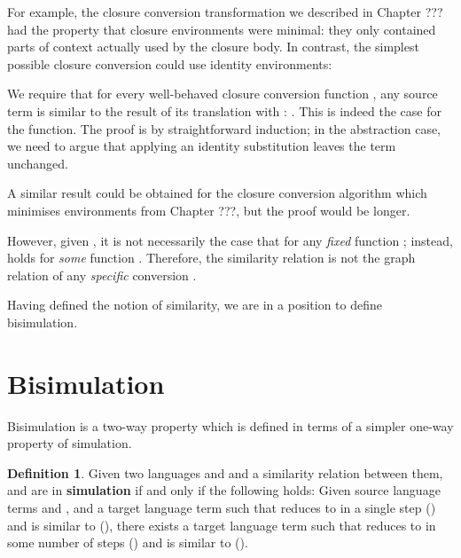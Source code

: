 \documentclass[bsc,frontabs,twoside,singlespacing,parskip,deptreport]{infthesis}
\theoremstyle{definition}
\newtheorem*{definition}{Definition}
\begin{document}
For example, the closure conversion transformation we described in
Chapter ??? had the property that closure environments were minimal:
they only contained parts of context actually used by the closure
body. In contrast, the simplest possible closure conversion could use
identity environments:


We require that for every well-behaved closure conversion function , any
source term  is similar to the result of its translation with
: . This is indeed the case for the 
function. The proof is by straightforward induction; in the
abstraction case, we need to argue that applying an identity substitution
leaves the term unchanged.


A similar result could be obtained for the closure conversion
algorithm which minimises environments from Chapter ???, but the proof
would be longer.

However, given , it is not
necessarily the case that  for any \textit{fixed}
function ; instead,  holds for \textit{some}
function . Therefore, the similarity relation is not the graph
relation of any \textit{specific} conversion .

Having defined the notion of similarity, we are in a position to
define bisimulation.

\section{Bisimulation}

Bisimulation is a two-way property which is defined in terms of a
simpler one-way property of simulation.

\begin{definition}{}
Given two languages  and  and a similarity relation
\AS{\_\textasciitilde\_}
between them,  and  are in \textbf{simulation} if and only
if the following holds:
Given source language terms  and , and a target language
term  such that  reduces to  in a single step () and
 is similar to  (), there exists a target
language term  such that  reduces to  in some
number of steps () and  is similar to  ().
\end{definition}
\end{document}
